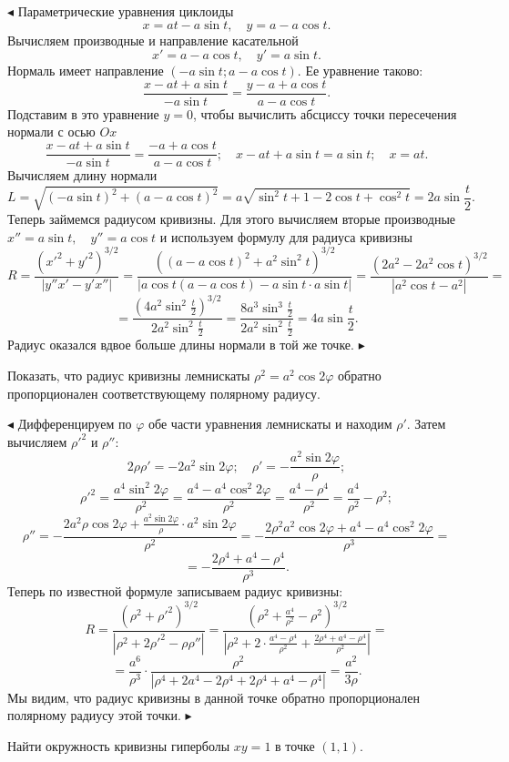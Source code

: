 \documentclass[a5paper,10pt]{article}
\begin{document}
\smallskip
\noindent $\blacktriangleleft$ Параметрические уравнения циклоиды $$x=at-a\sin t,\quad y=a-a\cos t.$$
Вычисляем производные и направление касательной $$x'=a-a\cos t,\quad y'=a\sin t.$$
Нормаль имеет направление $(-a\sin t; a-a\cos t)$. Ее уравнение таково:
$$\frac{x-at+a\sin t}{-a\sin t}=\frac{y-a+a\cos t}{a-a\cos t}.$$
Подставим в это уравнение $y=0$, чтобы вычислить абсциссу точки пересечения нормали
с осью $Ox$
$$\frac{x-at+a\sin t}{-a\sin t}=\frac{-a+a\cos t}{a-a\cos t};\quad x-at+a\sin t=a\sin t;\quad x=at.$$
Вычисляем длину нормали
$$L=\sqrt{(-a\sin t)^2+(a-a\cos t)^2}=a\sqrt{\sin^2 t+1-2\cos t+\cos^2t}=2a\sin\frac t2.$$
Теперь займемся радиусом кривизны. Для этого вычисляем вторые производные
$x''=a\sin t,\quad y''=a\cos t$ и используем формулу для радиуса кривизны
$$R=\frac{(x'^2+y'^2)^{3/2}}{|y''x'-y'x''|}=
\frac{((a-a\cos t)^2+a^2\sin^2 t)^{3/2}}{|a\cos t(a-a\cos t)-a\sin t\cdot a\sin t|}=
\frac{(2a^2-2a^2\cos t)^{3/2}}{|a^2\cos t-a^2|}=$$
$$=\frac{(4a^2\sin^2\frac t2)^{3/2}}{2a^2\sin^2\frac t2}=
\frac{8a^3\sin^3\frac t2}{2a^2\sin^2\frac t2}=4a\sin \frac t2.$$
Радиус оказался вдвое больше длины нормали в той же точке.
$\blacktriangleright$

\medskip
{} Показать, что радиус кривизны лемнискаты $\rho^2=a^2\cos 2\varphi$
обратно пропорционален соответствующему полярному радиусу.

\smallskip
\noindent $\blacktriangleleft$ Дифференцируем по $\varphi$ обе части уравнения лемнискаты и
находим $\rho'$. Затем вычисляем $\rho'^2$ и $\rho''$:
$$2\rho\rho'=-2a^2\sin 2\varphi;\quad \rho'=-\frac{a^2\sin 2\varphi}{\rho};$$
$$\rho'^2=\frac{a^4\sin^2 2\varphi}{\rho^2}=\frac{a^4-a^4\cos^2 2\varphi}{\rho^2}=
\frac{a^4-\rho^4}{\rho^2}=\frac{a^4}{\rho^2}-\rho^2;$$
$$\rho''=-\frac{2a^2\rho\cos 2\varphi+\frac{a^2\sin 2\varphi}{\rho}\cdot a^2\sin 2\varphi}{\rho^2}=
-\frac{2\rho^2 a^2\cos 2\varphi+a^4-a^4\cos^2 2\varphi}{\rho^3}=$$
$$=-\frac{2\rho^4+a^4-\rho^4}{\rho^3}.$$
Теперь по известной формуле записываем радиус кривизны:
$$R=\frac{(\rho^2+\rho'^2)^{3/2}}{|\rho^2+2\rho'^2-\rho\rho''|}=
\frac{(\rho^2+\frac{a^4}{\rho^2}-\rho^2)^{3/2}}{\left|\rho^2+2\cdot
\frac{a^4-\rho^4}{\rho^2}+\frac{2\rho^4+a^4-\rho^4}{\rho^2}\right|}=$$
$$=\frac{a^6}{\rho^3}\cdot\frac{\rho^2}{|\rho^4+2a^4-2\rho^4+2\rho^4+a^4-\rho^4|}=\frac{a^2}{3\rho}.$$
Мы видим, что радиус кривизны в данной точке обратно пропорционален полярному радиусу этой точки.
$\blacktriangleright$

\medskip
{} Найти окружность кривизны гиперболы $xy=1$ в точке
$(1,1)$.
\end{document}
